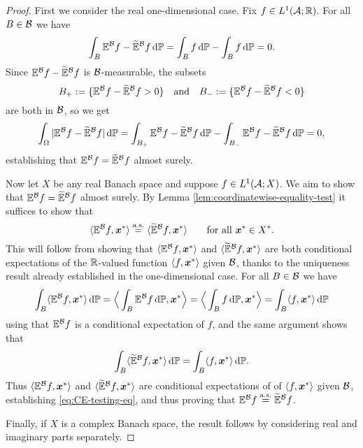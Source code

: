 \begin{proof}
  First we consider the real one-dimensional case.
  Fix $f \in L^1(\mathcal{A};\mathbb{R})$.
  For all $B \in \mathcal{B}$ we have
  \begin{equation*}
    \int_B \mathbb{E}^{\mathcal{B}}f - \widetilde{\mathbb{E}}^{\mathcal{B}}f \, \mathrm{d}\mathbb{P} = \int_B f \, \mathrm{d}\mathbb{P} - \int_B f \, \mathrm{d}\mathbb{P} = 0.
  \end{equation*}
  Since $\mathbb{E}^{\mathcal{B}}f - \widetilde{\mathbb{E}}^{\mathcal{B}}f$ is $\mathcal{B}$-measurable, the subsets
  \begin{equation*}
    B_+ := \{ \mathbb{E}^{\mathcal{B}}f - \widetilde{\mathbb{E}}^{\mathcal{B}}f > 0\} \quad \text{and} \quad B_- := \{\mathbb{E}^{\mathcal{B}}f - \widetilde{\mathbb{E}}^{\mathcal{B}}f < 0\}
  \end{equation*}
  are both in $\mathcal{B}$, so we get
  \begin{equation*}
    \int_\Omega |\mathbb{E}^{\mathcal{B}}f - \widetilde{\mathbb{E}}^{\mathcal{B}}f | \, \mathrm{d}\mathbb{P}
    = \int_{B_+}  \mathbb{E}^{\mathcal{B}}f - \widetilde{\mathbb{E}}^{\mathcal{B}}f \, \mathrm{d}\mathbb{P}
    -  \int_{B_-}  \mathbb{E}^{\mathcal{B}}f - \widetilde{\mathbb{E}}^{\mathcal{B}}f \, \mathrm{d}\mathbb{P}
    = 0,
  \end{equation*}
  establishing that $\mathbb{E}^{\mathcal{B}}f = \widetilde{\mathbb{E}}^{\mathcal{B}}f$ almost surely.

  Now let $X$ be any real Banach space and suppose $f \in L^1(\mathcal{A};X)$.
  We aim to show that $\mathbb{E}^{\mathcal{B}} f = \widetilde{\mathbb{E}}^{\mathcal{B}} f$ almost surely.
  By Lemma \ref{lem:coordinatewise-equality-test} it suffices to show that
  \begin{equation}\label{eq:CE-testing-eq}
    \langle \mathbb{E}^{\mathcal{B}} f, \bm{x}^* \rangle \stackrel{\mathrm{a.s.}}{=} \langle \widetilde{\mathbb{E}}^{\mathcal{B}} f, \bm{x}^* \rangle \qquad \text{for all $\bm{x}^* \in X^*$.}
  \end{equation}
  This will follow from showing that $\langle \mathbb{E}^{\mathcal{B}} f, \bm{x}^* \rangle$ and $\langle \widetilde{\mathbb{E}}^{\mathcal{B}} f, \bm{x}^* \rangle$ are both conditional expectations of the $\mathbb{R}$-valued function $\langle f, \bm{x}^* \rangle$ given $\mathcal{B}$, thanks to the uniqueness result already established in the one-dimensional case.
  For all $B \in \mathcal{B}$ we have
  \begin{equation*}
    \int_B \langle \mathbb{E}^{\mathcal{B}} f, \bm{x}^* \rangle \, \mathrm{d}\mathbb{P}
    = \Big\langle \int_B \mathbb{E}^{\mathcal{B}} f \, \mathrm{d}\mathbb{P}, \bm{x}^* \Big\rangle
    = \Big\langle \int_B f \, \mathrm{d}\mathbb{P}, \bm{x}^* \Big\rangle
    = \int_B \langle f, \bm{x}^* \rangle \, \mathrm{d}\mathbb{P}
  \end{equation*}
  using that $\mathbb{E}^{\mathcal{B}}f$ is a conditional expectation of $f$, and the same argument shows that
  \begin{equation*}
    \int_B \langle \widetilde{\mathbb{E}}^{\mathcal{B}} f, \bm{x}^* \rangle \, \mathrm{d}\mathbb{P} = \int_B \langle f, \bm{x}^* \rangle \, \mathrm{d}\mathbb{P}.
  \end{equation*}
  Thus $\langle \mathbb{E}^{\mathcal{B}} f, \bm{x}^* \rangle$ and $\langle \widetilde{\mathbb{E}}^{\mathcal{B}} f, \bm{x}^* \rangle$ are conditional expectations of of $\langle f, \bm{x}^* \rangle$ given $\mathcal{B}$, establishing \eqref{eq:CE-testing-eq}, and thus proving that $\mathbb{E}^{\mathcal{B}} f \stackrel{\mathrm{a.s.}}{=} \widetilde{\mathbb{E}}^{\mathcal{B}} f$.

  Finally, if $X$ is a complex Banach space, the result follows by considering real and imaginary parts separately.
\end{proof}

